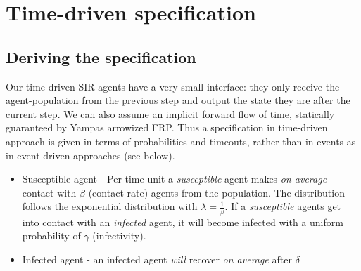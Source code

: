 \section{Time-driven specification}

\subsection{Deriving the specification}
Our time-driven SIR agents have a very small interface: they only receive the agent-population from the previous step and output the state they are after the current step. We can also assume an implicit forward flow of time, statically guaranteed by Yampas arrowized FRP. Thus a specification in time-driven approach is given in terms of probabilities and timeouts, rather than in events as in event-driven approaches (see below).

\begin{itemize}
	\item Susceptible agent - Per time-unit a \textit{susceptible} agent makes \textit{on average} contact with $\beta$ (contact rate) agents from the population. The distribution follows the exponential distribution with $\lambda = \frac{1}{\beta}$. If a \textit{susceptible} agents get into contact with an \textit{infected} agent, it will become infected with a uniform probability of $\gamma$ (infectivity). 
	
	\item Infected agent - an infected agent \textit{will} recover \textit{on average} after $\delta$ 
\end{itemize}
